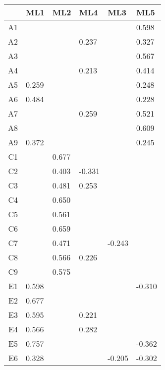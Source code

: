 \begin{table}[ht]
\centering
\begin{tabular}{rlllll}
  \toprule
 & {\textbf{ML1}} & {\textbf{ML2}} & {\textbf{ML4}} & {\textbf{ML3}} & {\textbf{ML5}} \\ 
  \midrule
A1 &        &        &        &        &  0.598 \\ 
  A2 &        &        &  0.237 &        &  0.327 \\ 
  A3 &        &        &        &        &  0.567 \\ 
  A4 &        &        &  0.213 &        &  0.414 \\ 
  A5 &  0.259 &        &        &        &  0.248 \\ 
  A6 &  0.484 &        &        &        &  0.228 \\ 
  A7 &        &        &  0.259 &        &  0.521 \\ 
  A8 &        &        &        &        &  0.609 \\ 
  A9 &  0.372 &        &        &        &  0.245 \\ 
  C1 &        &  0.677 &        &        &        \\ 
  C2 &        &  0.403 & -0.331 &        &        \\ 
  C3 &        &  0.481 &  0.253 &        &        \\ 
  C4 &        &  0.650 &        &        &        \\ 
  C5 &        &  0.561 &        &        &        \\ 
  C6 &        &  0.659 &        &        &        \\ 
  C7 &        &  0.471 &        & -0.243 &        \\ 
  C8 &        &  0.566 &  0.226 &        &        \\ 
  C9 &        &  0.575 &        &        &        \\ 
  E1 &  0.598 &        &        &        & -0.310 \\ 
  E2 &  0.677 &        &        &        &        \\ 
  E3 &  0.595 &        &  0.221 &        &        \\ 
  E4 &  0.566 &        &  0.282 &        &        \\ 
  E5 &  0.757 &        &        &        & -0.362 \\ 
  E6 &  0.328 &        &        & -0.205 & -0.302 \\ 

\end{tabular}
\end{table}
